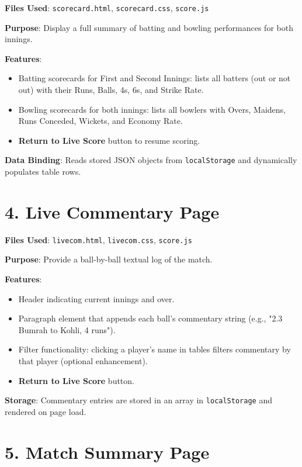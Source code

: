 \documentclass[a4paper,12pt]{article}
\begin{document}
\textbf{Files Used}: \texttt{scorecard.html}, \texttt{scorecard.css}, \texttt{score.js}

\textbf{Purpose}: Display a full summary of batting and bowling performances for both innings.

\textbf{Features}:
\begin{itemize}
  \item Batting scorecards for First and Second Innings: lists all batters (out or not out) with their Runs, Balls, 4s, 6s, and Strike Rate.
  \item Bowling scorecards for both innings: lists all bowlers with Overs, Maidens, Runs Conceded, Wickets, and Economy Rate.
  \item \textbf{Return to Live Score} button to resume scoring.
\end{itemize}

\textbf{Data Binding}: Reads stored JSON objects from \texttt{localStorage} and dynamically populates table rows.

\vspace{0.5cm}

\section*{4. Live Commentary Page}

\textbf{Files Used}: \texttt{livecom.html}, \texttt{livecom.css}, \texttt{score.js}

\textbf{Purpose}: Provide a ball-by-ball textual log of the match.

\textbf{Features}:
\begin{itemize}
  \item Header indicating current innings and over.
  \item Paragraph element that appends each ball's commentary string (e.g., "2.3 Bumrah to Kohli, 4 runs").
  \item Filter functionality: clicking a player's name in tables filters commentary by that player (optional enhancement).
  \item \textbf{Return to Live Score} button.
\end{itemize}

\textbf{Storage}: Commentary entries are stored in an array in \texttt{localStorage} and rendered on page load.

\vspace{0.5cm}

\section*{5. Match Summary Page}
\end{document}
